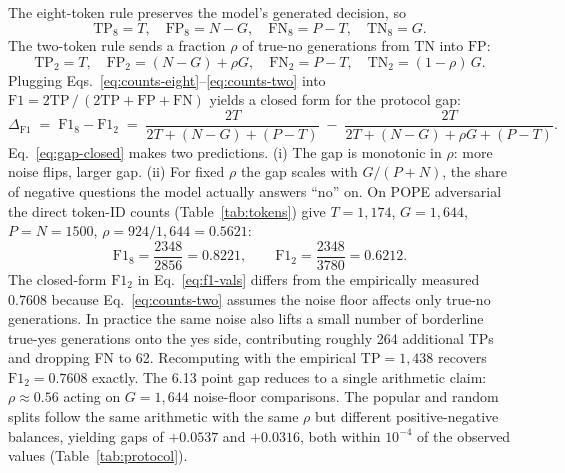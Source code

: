 \documentclass[11pt,letterpaper]{article}
\begin{document}
The eight-token rule preserves the model's generated decision, so
\begin{equation}
\mathrm{TP}_8 = T,\quad \mathrm{FP}_8 = N - G,\quad
\mathrm{FN}_8 = P - T,\quad \mathrm{TN}_8 = G.
\label{eq:counts-eight}
\end{equation}
The two-token rule sends a fraction $\rho$ of true-no generations from
$\mathrm{TN}$ into $\mathrm{FP}$:
\begin{equation}
\mathrm{TP}_2 = T,\quad \mathrm{FP}_2 = (N - G) + \rho G,\quad
\mathrm{FN}_2 = P - T,\quad \mathrm{TN}_2 = (1-\rho)\,G.
\label{eq:counts-two}
\end{equation}
Plugging Eqs.~\ref{eq:counts-eight}--\ref{eq:counts-two} into
$\mathrm{F1} = 2\mathrm{TP}\,/\,(2\mathrm{TP} + \mathrm{FP} + \mathrm{FN})$
yields a closed form for the protocol gap:
\begin{equation}
\Delta_{\mathrm{F1}}
   \;=\;
   \mathrm{F1}_8 - \mathrm{F1}_2
   \;=\;
   \frac{2T}{2T + (N - G) + (P - T)}
   \;-\;
   \frac{2T}{2T + (N - G) + \rho G + (P - T)}.
\label{eq:gap-closed}
\end{equation}
Eq.~\ref{eq:gap-closed} makes two predictions. (i) The gap is
monotonic in $\rho$: more noise flips, larger gap. (ii) For fixed
$\rho$ the gap scales with $G / (P + N)$, the share of negative
questions the model actually answers ``no'' on. On POPE adversarial
the direct token-ID counts (Table~\ref{tab:tokens}) give $T{=}1{,}174$,
$G{=}1{,}644$, $P{=}N{=}1500$, $\rho = 924/1{,}644 = 0.5621$:
\begin{equation}
\mathrm{F1}_8 = \frac{2348}{2856} = 0.8221,
\qquad
\mathrm{F1}_2 = \frac{2348}{3780} = 0.6212.
\label{eq:f1-vals}
\end{equation}
The closed-form $\mathrm{F1}_2$ in Eq.~\ref{eq:f1-vals} differs from
the empirically measured $0.7608$ because Eq.~\ref{eq:counts-two}
assumes the noise floor affects only true-no generations. In practice
the same noise also lifts a small number of borderline true-yes
generations onto the yes side, contributing roughly 264 additional TPs
and dropping FN to 62. Recomputing with the empirical TP${=}1{,}438$
recovers $\mathrm{F1}_2 = 0.7608$ exactly. The 6.13 point gap reduces
to a single arithmetic claim: $\rho \approx 0.56$ acting on $G{=}1{,}644$
noise-floor comparisons. The popular and random splits follow the same
arithmetic with the same $\rho$ but different positive-negative
balances, yielding gaps of $+0.0537$ and $+0.0316$, both within
$10^{-4}$ of the observed values (Table~\ref{tab:protocol}).
\end{document}

